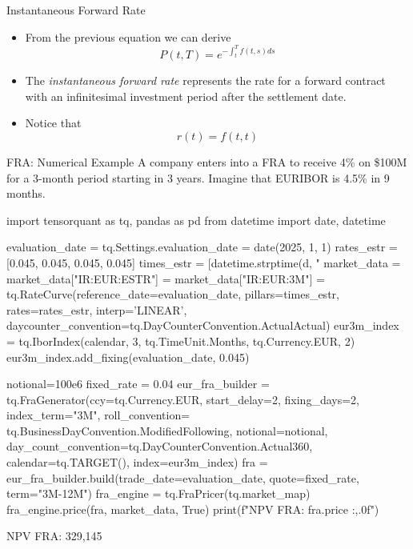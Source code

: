 \documentclass{beamer}
\begin{document}
\begin{frame}{Instantaneous Forward Rate}
	\begin{itemize}
		\item From the previous equation we can derive
		\begin{equation}
			P(t, T) = e^{-\int_t^T f(t, s) ds}
		\end{equation}
		\item The \emph{instantaneous forward rate} represents the rate for a forward contract with an infinitesimal investment period after the settlement date.
		\item Notice that
		\begin{equation*}
			r(t) = f(t,t)
		\end{equation*}
	\end{itemize}
\end{frame}

\begin{frame}[fragile]{FRA: Numerical Example}
A company enters into a FRA to receive 4\% on \$100M for a 3-month period starting in 3 years. Imagine that EURIBOR is 4.5\% in 9 months.
\begin{codebox}
\begin{ipython}[linewidth=\linewidth]
import tensorquant as tq, pandas as pd
from datetime import date, datetime

evaluation_date = tq.Settings.evaluation_date = date(2025, 1, 1)
rates_estr = [0.045, 0.045, 0.045, 0.045]
times_estr = [datetime.strptime(d, "%
market_data = {}
market_data["IR:EUR:ESTR"] = market_data["IR:EUR:3M"] = tq.RateCurve(reference_date=evaluation_date, pillars=times_estr,
                                        rates=rates_estr, interp='LINEAR',  daycounter_convention=tq.DayCounterConvention.ActualActual)
eur3m_index = tq.IborIndex(calendar, 3, tq.TimeUnit.Months, tq.Currency.EUR, 2)
eur3m_index.add_fixing(evaluation_date, 0.045)

notional=100e6
fixed_rate = 0.04
eur_fra_builder = tq.FraGenerator(ccy=tq.Currency.EUR, start_delay=2, fixing_days=2, index_term="3M", 
                                  roll_convention= tq.BusinessDayConvention.ModifiedFollowing, notional=notional,
                                  day_count_convention=tq.DayCounterConvention.Actual360, calendar=tq.TARGET(), index=eur3m_index)
fra = eur_fra_builder.build(trade_date=evaluation_date, quote=fixed_rate, term="3M-12M")
fra_engine = tq.FraPricer(tq.market_map)
fra_engine.price(fra, market_data, True)
print(f"NPV FRA: {fra.price :,.0f}")
\end{ipython}
\begin{ioutput}
NPV FRA: 329,145
\end{ioutput}
\end{codebox}
\end{frame}
\end{document}
